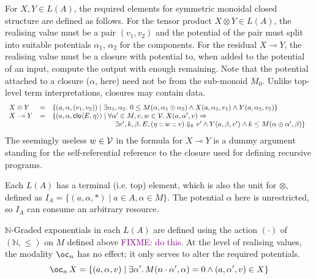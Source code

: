 \documentclass[acmsmall,review]{acmart}
\newcommand{\bob}[1]{\textcolor{purple}{FIXME: #1}}
\begin{document}
For $X, Y \in L(A)$, the required elements for symmetric monoidal
closed structure are defined as follows. For the tensor product
$X \otimes Y \in L(A)$, the realising value must be a pair $(v_1,v_2)$
and the potential of the pair must split into suitable potentials
$\alpha_1$, $\alpha_2$ for the components. For the residual
$X \multimap Y$, the realising value must be a closure with potential
to, when added to the potential of an input, compute the output with
enough remaining. Note that the potential attached to a closure
($\alpha$, here) need not be from the sub-monoid $M_0$. Unlike
top-level term interpretations, closures may contain data.
\begin{displaymath}
  \begin{array}{lcl}
    X \otimes Y &=& \{ (a, \alpha, (v_1, v_2)) \mid \exists \alpha_1, \alpha_2.~0 \leq M(\alpha, \alpha_1 \rplus \alpha_2) \land X(a,\alpha_1,v_1) \land Y(a,\alpha_2,v_2) \}\\
    X \multimap Y &=& \{ (a, \alpha, \clo{E}{\eta}) \mid
                      \begin{array}[t]{@{}l}
                        \forall \alpha' \in M, v,w \in \ValSet.\,X(a,\alpha',v) \Rightarrow\\
                        \quad \exists v', k, \beta.\,
                        E, (\eta :: w :: v) \Downarrow_k v' \land Y(a,\beta,v') \land k \leq M(\alpha \rplus \alpha', \beta) \} \end{array}
  \end{array}
\end{displaymath}
The seemingly useless $w \in \mathcal{V}$ in the formula for
$X \multimap Y$ is a dummy argument standing for the self-referential
reference to the closure used for defining recursive programs.

Each $L(A)$ has a terminal (i.e. top) element, which is also the unit
for $\otimes$, defined as
$I_A = \{(a, \alpha, *) \mid a \in A, \alpha \in M\}$. The potential
$\alpha$ here is unrestricted, so $I_A$ can consume an arbitrary
resource.

$\mathbb{N}$-Graded exponentials in each $L(A)$ are defined using the
action $(\cdot)$ of $(\mathbb{N}, \leq)$ on $M$ defined above \bob{do
  this}. At the level of realising values, the modality $\oc_n$ has no
effect; it only serves to alter the required potentials.
\begin{displaymath}
  \oc_n\,X = \{(a,\alpha,v) \mid \exists \alpha'.\,M(n \cdot \alpha', \alpha) = 0 \land (a, \alpha', v) \in X \}
\end{displaymath}
\end{document}
